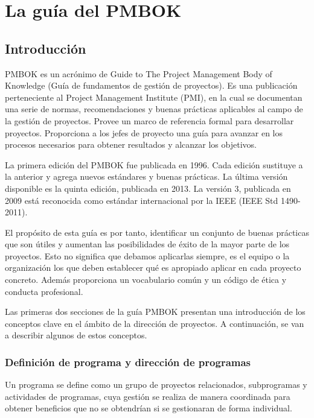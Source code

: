 \newpage{}
\section{La guía del PMBOK}

\subsection{Introducción}

PMBOK es un acrónimo de Guide to The Project Management Body of Knowledge (Guía de fundamentos de gestión de proyectos). Es una publicación perteneciente al Project Management Institute (PMI), en la cual se documentan una serie de normas, recomendaciones y buenas prácticas aplicables al campo de la gestión de proyectos. Provee un marco de referencia formal para desarrollar proyectos. Proporciona a los jefes de proyecto una guía para avanzar en los procesos necesarios para obtener resultados y alcanzar los objetivos. 

La primera edición del PMBOK fue publicada en 1996. Cada edición sustituye a la anterior y agrega nuevos estándares y buenas prácticas. La última versión disponible es la quinta edición, publicada en 2013. La versión 3, publicada en 2009 está reconocida como estándar internacional por la IEEE (IEEE Std 1490-2011).

El propósito de esta guía es por tanto, identificar un conjunto de buenas prácticas que son útiles y aumentan las posibilidades de éxito de la mayor parte de los proyectos. Esto no significa que debamos aplicarlas siempre, es el equipo o la organización los que deben establecer qué es apropiado aplicar en cada proyecto concreto. Además proporciona un vocabulario común y un código de ética y conducta profesional.

Las primeras dos secciones de la guía PMBOK presentan una introducción de los conceptos clave en el ámbito de la dirección de proyectos. A continuación, se van a describir algunos de estos conceptos.

\subsubsection{Definición de programa y dirección de programas}

Un programa se define como un grupo de proyectos relacionados, subprogramas y actividades de programas, cuya gestión se realiza de manera coordinada para obtener beneficios que no se obtendrían si se gestionaran de forma individual.

